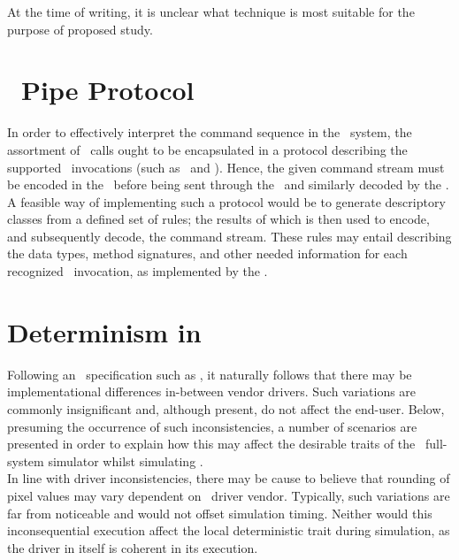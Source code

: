 At the time of writing, it is unclear what technique is most suitable for the purpose of proposed study.

\section*{\termsimics\ Pipe Protocol}
\label{sec:appendixa_simicspipeprotocol}

In order to effectively interpret the command sequence in the \termhost\ system, the assortment of \termapi\ calls ought to be encapsulated in a protocol describing the supported \termapi\ invocations (such as \termopengles\ and \termegl ).
Hence, the given command stream must be encoded in the \termguestsystemlibraries\ before being sent through the \termsimicspipe\ and similarly decoded by the \termhostrasterizationprocess .
A feasible way of implementing such a protocol would be to generate descriptory classes from a defined set of rules; the results of which is then used to encode, and subsequently decode, the command stream.
These rules may entail describing the data types, method signatures, and other needed information for each recognized \termapi\ invocation, as implemented by the \termrefsolu .

\section*{Determinism in \termopengles }
\label{sec:appendixa_determinisminopengles}

Following an \termapi\ specification such as \termopengles , it naturally follows that there may be implementational differences in-between vendor drivers.
Such variations are commonly insignificant and, although present, do not affect the end-user.
Below, presuming the occurrence of such inconsistencies, a number of scenarios are presented in order to explain how this may affect the desirable traits of the \termsimics\ full-system simulator whilst simulating \termopengles .\\

\noindent
In line with driver inconsistencies, there may be cause to believe that rounding of pixel values may vary dependent on \termhost\ driver vendor.
Typically, such variations are far from noticeable and would not offset simulation timing.
Neither would this inconsequential execution affect the local deterministic trait during simulation, as the driver in itself is coherent in its execution.

